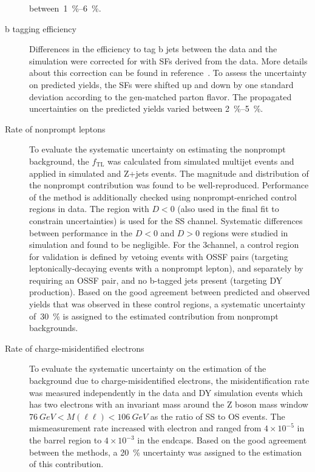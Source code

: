 \begin{description}
    between~\SIrange{1}{6}{\percent}.
  \item[b tagging efficiency] Differences in the efficiency to tag b jets between the data and the
    simulation were corrected for with SFs derived from the data. More details about this correction
    can be found in reference~\cite{Chatrchyan:2012jua,CMS-PAS-BTV-15-001}. To assess the
    uncertainty on predicted yields, the SFs were shifted up and down by one standard deviation
    according to the gen-matched parton flavor. The propagated uncertainties on the predicted yields
    varied between \SIrange{2}{5}{\percent}.
  \item[Rate of nonprompt leptons] To evaluate the systematic uncertainty on estimating the
    nonprompt background, the $f_\text{TL}$ was calculated from simulated multijet events and
    applied in simulated \ttbar and Z+jets events. The magnitude and distribution of the nonprompt
    contribution was found to be well-reproduced. Performance of the method is additionally checked
    using nonprompt-enriched control regions in data. The region with $D < 0$ (also used in the
    final fit to constrain uncertainties) is used for the SS \ttW channel. Systematic differences
    between performance in the $D < 0$ and $D > 0$ regions were studied in simulation and found to
    be negligible. For the 3\lep \ttZ channel, a control region for validation is defined by vetoing
    events with OSSF pairs (targeting leptonically-decaying \ttbar events with a nonprompt lepton),
    and separately by requiring an OSSF pair, and no b-tagged jets present (targeting DY
    production). Based on the good agreement between predicted and observed yields that was observed
    in these control regions, a systematic uncertainty of~\SI{30}{\percent} is assigned to the
    estimated contribution from nonprompt backgrounds.
  \item[Rate of charge-misidentified electrons] To evaluate the systematic uncertainty on the
    estimation of the background due to charge-misidentified electrons, the misidentification rate
    was measured independently in the data and DY simulation events which has two electrons with an
    invariant mass around the Z boson mass window $\SI{76}{GeV} < M(\ell\ell) < \SI{106}{GeV}$ as
    the ratio of SS to OS events. The mismeasurement rate increased with electron \pT and ranged
    from $4\times10^{-5}$ in the barrel region to $4\times10^{-3}$ in the endcaps. Based on the good
    agreement between the methods, a \SI{20}{\percent} uncertainty was assigned to the estimation of
    this contribution.

\end{description}
